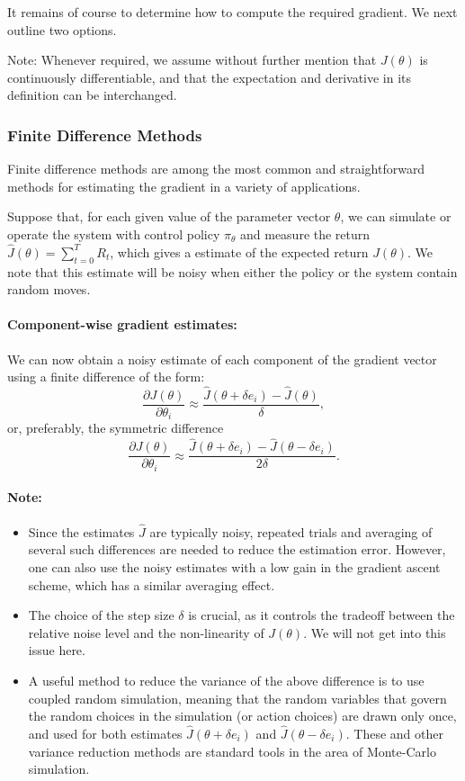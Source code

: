 It remains of course to determine how to compute the required gradient. We next outline two options.

Note: Whenever required, we assume without further mention that $J(\theta )$ is continuously differentiable, and that the expectation and derivative in its definition can be interchanged.

\subsubsection*{Finite Difference Methods}
Finite difference methods are among the most common and straightforward methods for estimating the gradient in a variety of applications.

Suppose that, for each given value of the parameter vector $\theta $, we can simulate or operate the system with control policy ${\pi _\theta }$ and measure the return  $\hat J(\theta ) = \sum\nolimits_{t = 0}^T {{R_t}} $, which gives a estimate of the expected return $J(\theta )$. We note that this estimate will be noisy when either the policy or the system contain random moves.

\paragraph{Component-wise gradient estimates:} We can now obtain a noisy estimate of each component of the gradient vector using a finite difference of the form:
\[\frac{{\partial J(\theta )}}{{\partial {\theta _i}}} \approx \frac{{\hat J(\theta  + \delta {e_i}) - \hat J(\theta )}}{\delta },\]
or, preferably, the symmetric difference
  \[\frac{{\partial J(\theta )}}{{\partial {\theta _i}}} \approx \frac{{\hat J(\theta  + \delta {e_i}) - \hat J(\theta  - \delta {e_i})}}{{2\delta }}.\]
\paragraph{Note:}
\begin{itemize}
  \item Since the estimates $\hat J$ are typically noisy, repeated trials and averaging of several such differences are needed to reduce the estimation error. However, one can also use the noisy estimates with a low gain in the gradient ascent scheme, which has a similar averaging effect.
  \item The choice of the step size $\delta $ is crucial, as it controls the tradeoff between the relative noise level and the non-linearity of $J(\theta )$. We will not get into this issue here.
  \item A useful method to reduce the variance of the above difference is to use coupled random simulation, meaning that the random variables that govern the random choices in the simulation (or action choices) are drawn only once, and used for both estimates $\hat J(\theta  + \delta {e_i})$ and $\hat J(\theta  - \delta {e_i})$. These and other variance reduction methods are standard tools in the area of Monte-Carlo simulation.
\end{itemize}

